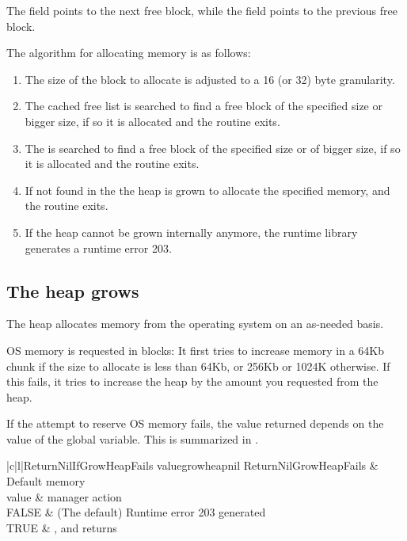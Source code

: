 The  field points to the next free block, while
the  field points to the previous free block.

The algorithm for allocating memory is as follows:

\begin{enumerate}
\item The size of the block to allocate is adjusted to a 16 (or 32) byte granularity.
\item The cached free list is searched to find a free block of the specified
 size or bigger size, if so it is allocated and the routine exits.
\item The  is searched to find a free block of the specified size
or of bigger size, if so it is allocated and the routine exits.
\item If not found in the  the heap is grown to allocate the
specified memory, and the routine exits.
\item If the heap cannot be grown internally anymore, the runtime library 
generates a runtime error 203.
\end{enumerate}


\subsection{The heap grows}
The heap allocates memory from the operating system on an as-needed basis.

OS memory is requested in blocks: It first tries to increase memory in a 64Kb 
chunk if the size to allocate is less than 64Kb, or 256Kb or 1024K otherwise.
If this fails, it tries to increase the heap by the amount you requested
from the heap.

If the attempt to reserve OS memory fails, the value returned depends on the
value of the  global variable. This is summarized
in .

\begin{FPCltable}{|c|l|}{ReturnNilIfGrowHeapFails value}{growheapnil}
\hline
  ReturnNilGrowHeapFails & Default memory \\
    value		 & manager action \\
\hline  
     FALSE	        & (The default) Runtime error 203 generated \\
     TRUE 		& ,  and  returns  \\
\hline
\end{FPCltable}

